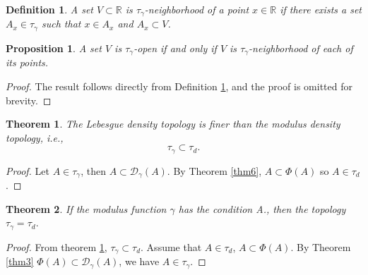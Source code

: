 \documentclass{amsart}
\newtheorem{theorem}{Theorem}
\theoremstyle{plain}
\newtheorem{corollary}{Corollary}
\newtheorem{definition}{Definition}
\newtheorem{proposition}{Proposition}
\numberwithin{equation}{section}
\begin{document}
\begin{definition}\label{def4}
A set $V\subset \mathbb{R}$ is $\tau_{\gamma}$-neighborhood of a point $x\in \mathbb{R}$ if there exists a set $A_x\in \tau_\gamma$ such that $x\in A_x$ and $A_x\subset V$. 
\end{definition}
\begin{proposition}
 A set $V$ is $\tau_\gamma$-open if and only if $V$ is $\tau_\gamma$-neighborhood of each of its points. 
\end{proposition}
\begin{proof}
   The result follows directly from Definition \ref{def4}, and the proof is omitted for brevity. 
\end{proof}
\begin{theorem}\label{thm2.6}
    The Lebesgue density topology is finer than the modulus density topology, i.e., $$\tau_\gamma \subset \tau_d.$$
\end{theorem}

\begin{proof}
    Let $A\in \tau_\gamma$, then $A\subset \mathcal{D}_\gamma (A).$ By Theorem \ref{thm6}, $A\subset \Phi(A)$ so $A\in \tau_d$.
\end{proof}
\begin{theorem}\label{thm2.5}
     If the modulus function $\gamma$ has the condition A., then the topology $\tau_{\gamma}=\tau_d.$ 
\end{theorem}
\begin{proof}
From theorem \ref{thm2.6}, $\tau_\gamma \subset \tau_d.$
Assume that $A\in \tau_d$, $A\subset \Phi(A)$. By Theorem \ref{thm3} $\Phi(A)\subset \mathcal{D}_\gamma(A)$, we have $A\in \tau_\gamma.$ 
\end{proof}
\end{document}
